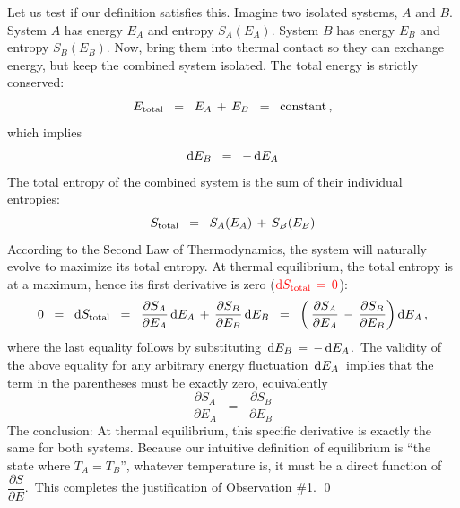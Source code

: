 \vskip 0.4cm
\noindent
Let us test if our definition satisfies this.
Imagine two isolated systems, $A$ and $B$.
System $A$ has energy $E_{A}$ and entropy $S_{A}(E_{A})$.
System $B$ has energy $E_{B}$ and entropy $S_{B}(E_{B})$.
Now, bring them into thermal contact so they can exchange energy,
but keep the combined system isolated.
The total energy is strictly conserved:
\begin{equation*}
E_{\textnormal{total}}
\;\; = \;\;
    E_{A} \,+\, E_{B}
\;\; = \;\;
    \textnormal{constant}\,,
\end{equation*}
which implies
\begin{equation*}
\textnormal{d} E_{B}
\;\; = \;\;
    -\,\textnormal{d} E_{A}
\end{equation*}
The total entropy of the combined system
is the sum of their individual entropies:
\begin{equation*}
S_{\textnormal{total}}
\;\; = \;\;
    S_{A}(E_{A}) \,+\, S_{B}(E_{B})
\end{equation*}
According to the Second Law of Thermodynamics,
the system will naturally evolve to maximize its total entropy.
{\color{red}At thermal equilibrium}, the total entropy is at a maximum,
hence its first derivative is zero
(${\color{red}\textnormal{d} S_{\textnormal{total}} \,=\, 0}$):
\begin{equation*}
0
\;\; = \;\;
    \textnormal{d} S_{\textnormal{total}}
\;\; = \;\;
    \dfrac{\partial S_{A}}{\partial E_{A}}\,\textnormal{d} E_{A}
    \, + \,
    \dfrac{\partial S_{B}}{\partial E_{B}}\,\textnormal{d} E_{B}
\;\; = \;\;
    \left(\,
        \dfrac{\partial S_{A}}{\partial E_{A}}
        \, - \,
        \dfrac{\partial S_{B}}{\partial E_{B}}
        \right)
    \textnormal{d} E_{A}\,,
\end{equation*}
where the last equality follows by substituting \,$\textnormal{d} E_{B} \,=\, -\,\textnormal{d} E_{A}$.\,
The validity of the above equality
for any {\color{red}arbitrary energy fluctuation} \,$\textnormal{d} E_{A}$\,
implies that the term in the parentheses must be exactly zero,
equivalently
\begin{equation*}
\dfrac{\partial S_{A}}{\partial E_{A}}
\;\; = \;\;
    \dfrac{\partial S_{B}}{\partial E_{B}}
\end{equation*}
The conclusion: At thermal equilibrium,
this specific derivative is exactly the same for both systems.
Because our intuitive definition of equilibrium is ``the state
where $T_A = T_B$'', whatever temperature is,
it must be a direct function of \,$\dfrac{\partial S}{\partial E}$.\,
This completes the justification of Observation \#1.
\qed

